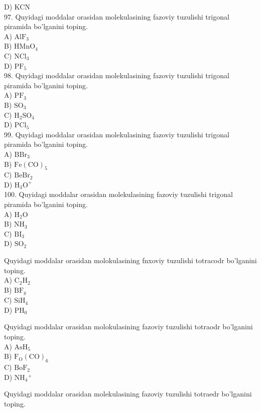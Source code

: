 D) KCN\\
97. Quyidagi moddalar orasidan molekulasining fazoviy tuzulishi trigonal piramida bo'lganini toping.\\
A) $\mathrm{AlF}_{3}$\\
B) $\mathrm{HMnO}_{4}$\\
C) $\mathrm{NCl}_{3}$\\
D) $\mathrm{PF}_{5}$\\
98. Quyidagi moddalar orasidan molekulasining fazoviy tuzulishi trigonal piramida bo'lganini toping.\\
A) $\mathrm{PF}_{3}$\\
B) $\mathrm{SO}_{3}$\\
C) $\mathrm{H}_{2} \mathrm{SO}_{4}$\\
D) $\mathrm{PCl}_{5}$\\
99. Quyidagi moddalar orasidan molekulasining fazoviy tuzulishi trigonal piramida bo'lganini toping.\\
A) $\mathrm{BBr}_{3}$\\
B) $\mathrm{Fe}(\mathrm{CO})_{5}$\\
C) $\mathrm{BeBr}_{2}$\\
D) $\mathrm{H}_{3} \mathrm{O}^{+}$\\
100. Quyidagi moddalar orasidan molekulasining fazoviy tuzulishi trigonal piramida bo'lganini toping.\\
A) $\mathrm{H}_{2} \mathrm{O}$\\
B) $\mathrm{NH}_{3}$\\
C) $\mathrm{BI}_{3}$\\
D) $\mathrm{SO}_{2}$
  \item Quyidagi moddalar orasidan molokulasining fnxoviy tuzulishi totracodr bo'lganini toping.\\
A) $\mathrm{C}_{2} \mathrm{H}_{2}$\\
B) $\mathrm{BF}_{y}$\\
C) $\mathrm{SiH}_{4}$\\
D) $\mathrm{PH}_{0}$
  \item Quyidagi moddalar orasidan molokulasining fazoviy tuzulishi totraodr bo'lganini toping.\\
A) $\mathrm{AsH}_{5}$\\
B) $\mathrm{F}_{\mathrm{O}}(\mathrm{CO})_{6}$\\
C) $\mathrm{BoF}_{2}$\\
D) $\mathrm{NH}_{4}{ }^{+}$
  \item Quyidagi moddalar orasidan molekulasining fazoviy tuzulishi totraedr bo'lganini toping.\\
